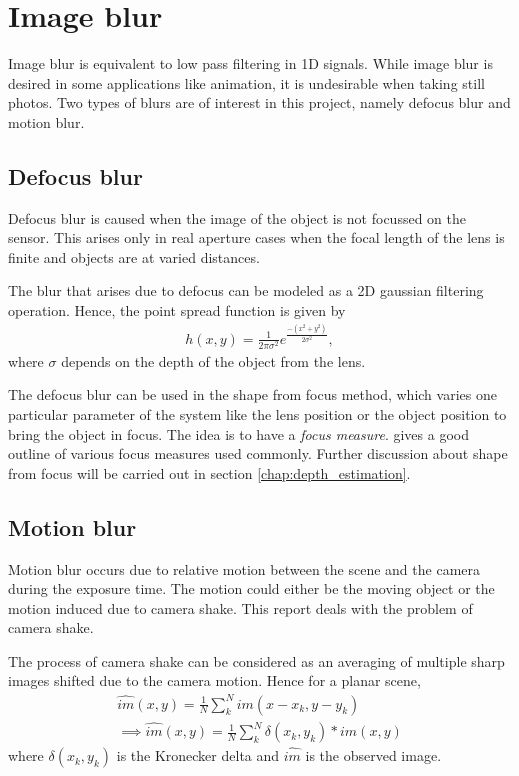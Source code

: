 \documentclass[BTech]{iitmdiss}
\begin{document}
\section{Image blur}
\label{basic_theory:image_blur}
Image blur is equivalent to low pass filtering in 1D signals. While 
image blur is desired in some applications like animation, it is 
undesirable when taking still photos. Two types of blurs are of interest
in this project, namely defocus blur and motion blur.

\subsection{Defocus blur}
\label{basic_theory:image_blur:optical}
Defocus blur is caused when the image of the object is not focussed on 
the sensor. This arises only in real aperture cases
when the focal length of the lens is finite and objects are at varied
distances. 

The blur that arises due to defocus can be modeled as a 2D gaussian
filtering operation. Hence, the point spread function is given by
\begin{align*}
h(x,y) = \frac{1}{2\pi\sigma^2}e^\frac{-(x^2+y^2)}{2\sigma^2},
\end{align*}
where $\sigma$ depends on the depth of the object from the lens. 

The defocus blur can be used in the shape from focus method, which 
varies one particular parameter of the system like the lens position or
the object position to bring the object in focus. The idea is to have a 
\emph{focus measure}. \citet{pertuz2013analysis} gives a good outline of 
various focus measures used commonly. Further discussion about shape
from focus will be carried out in section \ref{chap:depth_estimation}.

\subsection{Motion blur}
\label{basic_theory:image_blur:motion}
Motion blur occurs due to relative motion between the scene and the 
camera during the exposure time. The motion could either be the moving 
object or the motion induced due to camera shake. This report deals with
the problem of camera shake.

The process of camera shake can be considered as an averaging of 
multiple sharp images shifted due to the camera motion. Hence for a 
planar scene, 
\begin{align*}
\hat{im}(x,y) = \frac{1}{N}\sum_k^Nim(x-x_k,y-y_k)\\
\implies\hat{im}(x,y) = \frac{1}{N}\sum_k^N\delta(x_k, y_k)*im(x,y)
\end{align*}
where $\delta(x_k, y_k)$ is the Kronecker delta and $\hat{im}$ is
the observed image.
\end{document}
